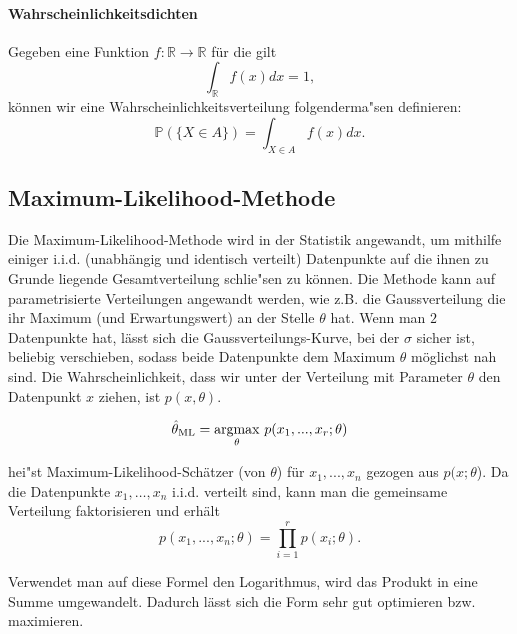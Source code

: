 \paragraph{Wahrscheinlichkeitsdichten}

Gegeben eine Funktion $f: \mathbb{R} \rightarrow \mathbb{R}$ f\"ur die gilt 
\begin{equation*}
\int_{\mathbb{R}} f(x) dx = 1,
\end{equation*}
k\"onnen wir eine Wahrscheinlichkeitsverteilung folgenderma"sen definieren:
\begin{equation*}
\mathbb{P} (\{X\in A\}) = \int_{X \in A} f(x) dx. 
\end{equation*}


\subsection{Maximum-Likelihood-Methode}

Die Maximum-Likelihood-Methode wird in der Statistik angewandt, um mithilfe einiger i.i.d. (unabh\"angig und identisch verteilt) Datenpunkte auf die ihnen zu Grunde liegende Gesamtverteilung schlie"sen zu k\"onnen. Die Methode kann auf parametrisierte Verteilungen angewandt werden, wie z.B. die Gaussverteilung die ihr Maximum (und Erwartungswert) an der Stelle $\theta$ hat. Wenn man $2$ Datenpunkte hat, l\"asst sich die Gaussverteilungs-Kurve, bei der $\sigma$ sicher ist, beliebig verschieben, sodass beide Datenpunkte dem Maximum $\theta$ m\"oglichst nah sind.
Die Wahrscheinlichkeit, dass wir unter der Verteilung mit Parameter $\theta$ den Datenpunkt $x$ ziehen, ist $p(x,\theta)$. 

\begin{equation*}
\hat{\theta}_{\rm ML} = \underset{\theta}{\operatorname{argmax}} \,\, p (x_{1},...,x_{r};\theta)
\end{equation*}

\noindent hei"st Maximum-Likelihood-Sch\"atzer (von $\theta$) für $x_{1},...,x_{n}$ gezogen aus $p(x;\theta$). Da die Datenpunkte $x_1, \dots, x_n$ i.i.d. verteilt sind, kann man die gemeinsame Verteilung faktorisieren und erh\"alt
\begin{equation*}
p (x_{1},...,x_{n};\theta) = \prod_{i=1}^r p(x_i;\theta).
\end{equation*}

Verwendet man auf diese Formel den Logarithmus, wird das Produkt in eine Summe umgewandelt. Dadurch l\"asst sich die Form sehr gut optimieren bzw. maximieren. 



